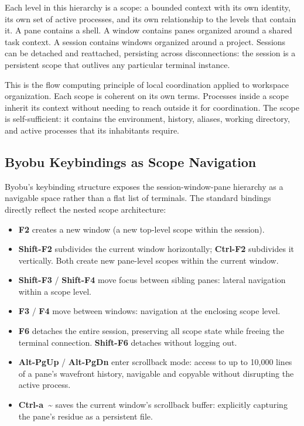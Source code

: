 \documentclass[12pt, a4paper]{article}
\begin{document}
Each level in this hierarchy is a scope: a bounded context with
its own identity, its own set of active processes, and its own
relationship to the levels that contain it. A pane contains a
shell. A window contains panes organized around a shared task
context. A session contains windows organized around a project.
Sessions can be detached and reattached, persisting across
disconnections: the session is a persistent scope that outlives
any particular terminal instance.

This is the flow computing principle of local coordination
applied to workspace organization. Each scope is coherent on
its own terms. Processes inside a scope inherit its context
without needing to reach outside it for coordination. The
scope is self-sufficient: it contains the environment, history,
aliases, working directory, and active processes that its
inhabitants require.

\subsection{Byobu Keybindings as Scope Navigation}

Byobu's keybinding structure exposes the session-window-pane
hierarchy as a navigable space rather than a flat list of
terminals. The standard bindings directly reflect the nested
scope architecture:

\begin{itemize}
\item \textbf{F2} creates a new window (a new top-level scope
  within the session).
\item \textbf{Shift-F2} subdivides the current window
  horizontally; \textbf{Ctrl-F2} subdivides it vertically.
  Both create new pane-level scopes within the current window.
\item \textbf{Shift-F3} / \textbf{Shift-F4} move focus between
  sibling panes: lateral navigation within a scope level.
\item \textbf{F3} / \textbf{F4} move between windows:
  navigation at the enclosing scope level.
\item \textbf{F6} detaches the entire session, preserving all
  scope state while freeing the terminal connection.
  \textbf{Shift-F6} detaches without logging out.
\item \textbf{Alt-PgUp} / \textbf{Alt-PgDn} enter scrollback
  mode: access to up to 10,000 lines of a pane's wavefront
  history, navigable and copyable without disrupting the active
  process.
\item \textbf{Ctrl-a~\textasciitilde} saves the current window's
  scrollback buffer: explicitly capturing the pane's residue
  as a persistent file.
\end{itemize}
\end{document}
